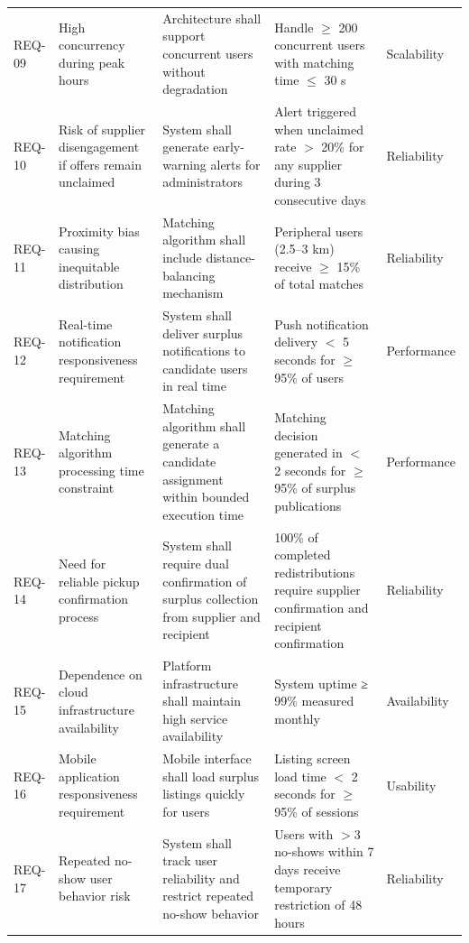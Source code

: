 \documentclass[12pt]{article}
\begin{document}
\begin{longtable}{p{1.5cm} p{3cm} p{4cm} p{4cm} p{2cm} }
REQ-09 & High concurrency during peak hours  & Architecture shall support concurrent users without degradation & Handle $≥$ 200 concurrent users with matching time $≤$ 30 s & Scalability\\
REQ-10 & Risk of supplier disengagement if offers remain unclaimed & System shall generate early-warning alerts for administrators & Alert triggered when unclaimed rate $>$ 20\% for any supplier during 3 consecutive days & Reliability\\
REQ-11 & Proximity bias causing inequitable distribution & Matching algorithm shall include distance-balancing mechanism & Peripheral users (2.5–3 km) receive $≥$ 15\% of total matches & Reliability\\
REQ-12 & Real-time notification responsiveness requirement & System shall deliver surplus notifications to candidate users in real time & Push notification delivery $<$ 5 seconds for $\geq$ 95\% of users & Performance \\
REQ-13 & Matching algorithm processing time constraint & Matching algorithm shall generate a candidate assignment within bounded execution time & Matching decision generated in $<$ 2 seconds for $\geq$ 95\% of surplus publications & Performance \\
REQ-14 & Need for reliable pickup confirmation process & System shall require dual confirmation of surplus collection from supplier and recipient & 100\% of completed redistributions require supplier confirmation and recipient confirmation & Reliability \\
REQ-15 & Dependence on cloud infrastructure availability & Platform infrastructure shall maintain high service availability & System uptime ≥ 99\% measured monthly & Availability \\
REQ-16 & Mobile application responsiveness requirement & Mobile interface shall load surplus listings quickly for users & Listing screen load time $<$ 2 seconds for $\geq$ 95\% of sessions & Usability \\
REQ-17 & Repeated no-show user behavior risk & System shall track user reliability and restrict repeated no-show behavior & Users with $>$3 no-shows within 7 days receive temporary restriction of 48 hours & Reliability \\
\bottomrule
\end{longtable}
\end{document}
